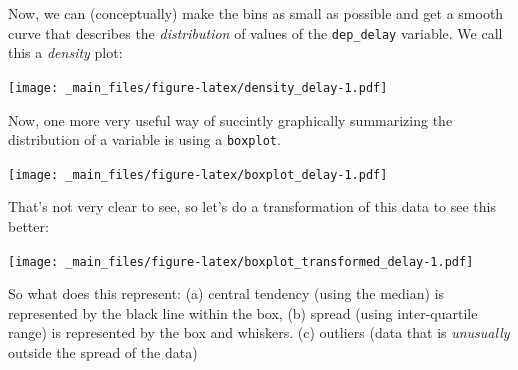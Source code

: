 \documentclass[]{article}
\newenvironment{Shaded}{\begin{snugshade}}{\end{snugshade}}
\newcommand{\KeywordTok}[1]{\textcolor[rgb]{0.13,0.29,0.53}{\textbf{{#1}}}}
\newcommand{\DataTypeTok}[1]{\textcolor[rgb]{0.13,0.29,0.53}{{#1}}}
\newcommand{\DecValTok}[1]{\textcolor[rgb]{0.00,0.00,0.81}{{#1}}}
\newcommand{\StringTok}[1]{\textcolor[rgb]{0.31,0.60,0.02}{{#1}}}
\newcommand{\OtherTok}[1]{\textcolor[rgb]{0.56,0.35,0.01}{{#1}}}
\newcommand{\NormalTok}[1]{{#1}}
\theoremstyle{definition}
\theoremstyle{definition}
\theoremstyle{remark}
\begin{document}
Now, we can (conceptually) make the bins as small as possible and get a
smooth curve that describes the \emph{distribution} of values of the
\texttt{dep\_delay} variable. We call this a \emph{density} plot:

\begin{Shaded}
\end{Shaded}

\texttt{[image: \_main\_files/figure-latex/density\_delay-1.pdf]}

Now, one more very useful way of succintly graphically summarizing the
distribution of a variable is using a \texttt{boxplot}.

\begin{Shaded}
\end{Shaded}

\texttt{[image: \_main\_files/figure-latex/boxplot\_delay-1.pdf]}

That's not very clear to see, so let's do a transformation of this data
to see this better:

\begin{Shaded}
\end{Shaded}

\texttt{[image: \_main\_files/figure-latex/boxplot\_transformed\_delay-1.pdf]}

So what does this represent: (a) central tendency (using the median) is
represented by the black line within the box, (b) spread (using
inter-quartile range) is represented by the box and whiskers. (c)
outliers (data that is \emph{unusually} outside the spread of the data)
\end{document}
